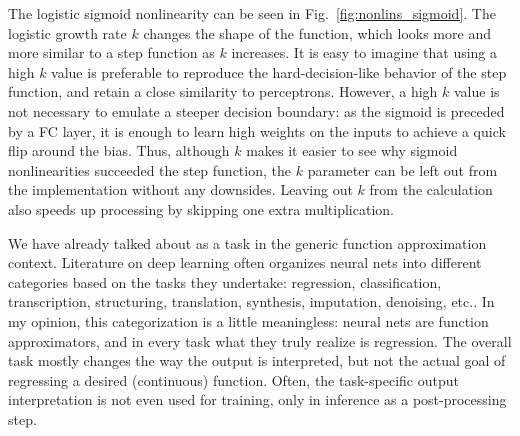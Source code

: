 			The logistic sigmoid nonlinearity can be seen in Fig.~\ref{fig:nonlins_sigmoid}.
			The logistic growth rate $k$ changes the shape of the function, which looks more and more similar to a step function as $k$ increases.
			It is easy to imagine that using a high $k$ value is preferable to reproduce the hard-decision-like behavior of the step function, and retain a close similarity to perceptrons.
			However, a high $k$ value is not necessary to emulate a steeper decision boundary: as the sigmoid is preceded by a \ac{FC} layer, it is enough to learn high weights on the inputs to achieve a quick flip around the bias.
			Thus, although $k$ makes it easier to see why sigmoid nonlinearities succeeded the step function, the $k$ parameter can be left out from the implementation without any downsides.
			Leaving out $k$ from the calculation also speeds up processing by skipping one extra multiplication.
			
			We have already talked about  as a task in the generic function approximation context.
			Literature on deep learning often organizes neural nets into different categories based on the tasks they undertake: regression, classification, transcription, structuring, translation, synthesis, imputation, denoising, etc..
			In my opinion, this categorization is a little meaningless: neural nets are function approximators, and in every task what they truly realize is regression.
			The overall task mostly changes the way the output is interpreted, but not the actual goal of regressing a desired (continuous) function.
			Often, the task-specific output interpretation is not even used for training, only in inference as a post-processing step.
			
